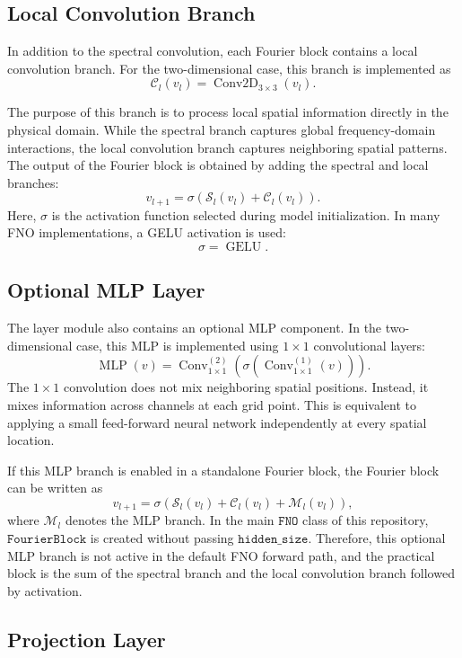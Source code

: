 \documentclass[14pt]{extarticle}
\begin{document}
\subsection{Local Convolution Branch}

In addition to the spectral convolution, each Fourier block contains a local convolution branch. For the two-dimensional case, this branch is implemented as
\[
\mathcal{C}_l(v_l)
=
\operatorname{Conv2D}_{3 \times 3}(v_l).
\]

The purpose of this branch is to process local spatial information directly in the physical domain. While the spectral branch captures global frequency-domain interactions, the local convolution branch captures neighboring spatial patterns. The output of the Fourier block is obtained by adding the spectral and local branches:
\[
v_{l+1}
=
\sigma
\left(
\mathcal{S}_l(v_l)
+
\mathcal{C}_l(v_l)
\right).
\]
Here, \(\sigma\) is the activation function selected during model initialization. In many FNO implementations, a GELU activation is used:
\[
\sigma = \operatorname{GELU}.
\]

\subsection{Optional MLP Layer}

The layer module also contains an optional MLP component. In the two-dimensional case, this MLP is implemented using \(1 \times 1\) convolutional layers:
\[
\operatorname{MLP}(v)
=
\operatorname{Conv}_{1 \times 1}^{(2)}
\left(
\sigma
\left(
\operatorname{Conv}_{1 \times 1}^{(1)}(v)
\right)
\right).
\]
The \(1 \times 1\) convolution does not mix neighboring spatial positions. Instead, it mixes information across channels at each grid point. This is equivalent to applying a small feed-forward neural network independently at every spatial location.

If this MLP branch is enabled in a standalone Fourier block, the Fourier block can be written as
\[
v_{l+1}
=
\sigma
\left(
\mathcal{S}_l(v_l)
+
\mathcal{C}_l(v_l)
+
\mathcal{M}_l(v_l)
\right),
\]
where \(\mathcal{M}_l\) denotes the MLP branch. In the main \(\texttt{FNO}\) class of this repository, \(\texttt{FourierBlock}\) is created without passing \(\texttt{hidden\_size}\). Therefore, this optional MLP branch is not active in the default FNO forward path, and the practical block is the sum of the spectral branch and the local convolution branch followed by activation.

\subsection{Projection Layer}
\end{document}
